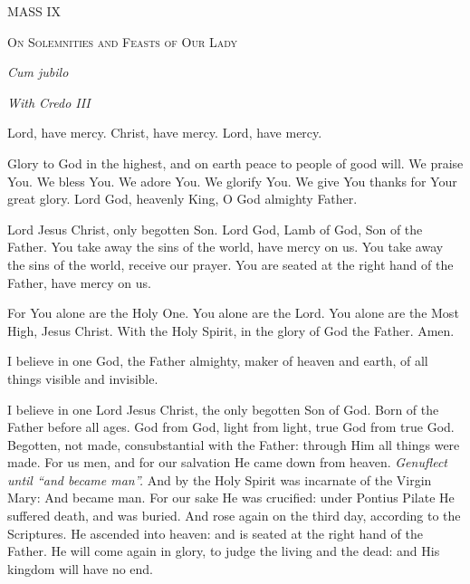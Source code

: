 \documentclass[11pt]{article} %
\begin{document}
\begin{center}\begin{huge}\textsc{MASS IX}\end{huge}\end{center}
\begin{center}\begin{huge}\textsc{On Solemnities and Feasts of Our Lady}\end{huge}\end{center}
\begin{center}\begin{huge}\emph{Cum jubilo}\end{huge}\end{center}
\begin{center}\begin{large}\emph{With Credo III}\end{large}\end{center}

\def\greinitialformat#1{%
{\fontsize{34}{34}\selectfont #1}%
}

\vskip30pt

Lord, have mercy. Christ, have mercy. Lord, have mercy.

\vskip20pt

Glory to God in the highest, and on earth peace to people of good will.  We praise You.  We bless You.  We adore You.  We glorify You.  We give You thanks for Your great glory.  Lord God, heavenly King, O God almighty Father.

Lord Jesus Christ, only begotten Son.  Lord God, Lamb of God, Son of the Father.  You take away the sins of the world, have mercy on us.  You take away the sins of the world, receive our prayer.  You are seated at the right hand of the Father, have mercy on us.

For You alone are the Holy One.  You alone are the Lord.  You alone are the Most High, Jesus Christ.  With the Holy Spirit, in the glory of God the Father.  Amen.

\vskip20pt

I believe in one God, the Father almighty, maker of heaven and earth, of all things visible and invisible.

I believe in one Lord Jesus Christ, the only begotten Son of God.  Born of the Father before all ages.  God from God, light from light, true God from true God.  Begotten, not made, consubstantial with the Father: through Him all things were made.  For us men, and for our salvation He came down from heaven. \emph{Genuflect until ``and became man''.}  And by the Holy Spirit was incarnate of the Virgin Mary:  And became man.  For our sake He was crucified: under Pontius Pilate He suffered death, and was buried.  And rose again on the third day, according to the Scriptures.  He ascended into heaven: and is seated at the right hand of the Father.  He will come again in glory, to judge the living and the dead: and His kingdom will have no end.
\end{document}
